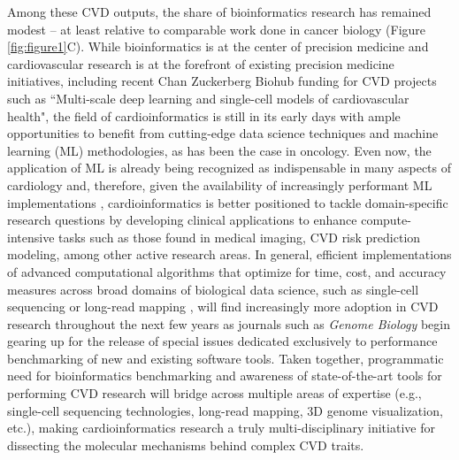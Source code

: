 \documentclass[letter]{bioinfo}
\begin{document}
Among these CVD outputs, the share of bioinformatics research has remained modest -- at least relative to comparable work done in cancer biology (Figure \ref{fig:figure1}C). While bioinformatics is at the center of precision medicine \citep{Gomez-Lopez:2017:Precision} and cardiovascular research is at the forefront of existing precision medicine initiatives, including recent Chan Zuckerberg Biohub funding for CVD projects such as ``Multi-scale deep learning and single-cell models of cardiovascular health", the field of cardioinformatics is still in its early days with ample opportunities to benefit from cutting-edge data science techniques and machine learning (ML) methodologies, as has been the case in oncology.  Even now, the application of ML is already being recognized as indispensable in many aspects of cardiology \citep{Shameer:2017:Translational,Shameer:2018:Machine} and, therefore, given the availability of increasingly performant ML implementations \citep{MLPerf:2018:MLPerf}, cardioinformatics is better positioned to tackle domain-specific research questions by developing clinical applications to enhance compute-intensive tasks such as those found in medical imaging, CVD risk prediction modeling, among other active research areas. In general, efficient implementations of advanced computational algorithms that optimize for time, cost, and accuracy measures across broad domains of biological data science, such as single-cell sequencing \citep{Becht:2018:Evaluation} or long-read mapping \citep{Li:2018:Minimap2}, will find increasingly more adoption in CVD research throughout the next few years as journals such as \emph{Genome Biology} begin gearing up for the release of special issues dedicated exclusively to performance benchmarking of new and existing software tools.  Taken together, programmatic need for bioinformatics benchmarking and awareness of state-of-the-art tools for performing CVD research will bridge across multiple areas of expertise (e.g., single-cell sequencing technologies, long-read mapping, 3D genome visualization, etc.), making cardioinformatics research a truly multi-disciplinary initiative for dissecting the molecular mechanisms behind complex CVD traits.   
\end{document}
